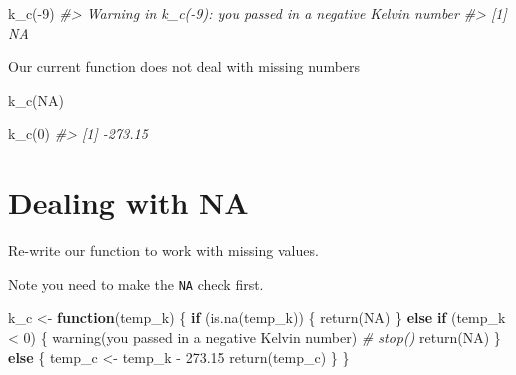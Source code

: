 \documentclass[
]{book}
\newenvironment{Shaded}{\begin{snugshade}}{\end{snugshade}}
\newcommand{\CommentTok}[1]{\textcolor[rgb]{0.56,0.35,0.01}{\textit{#1}}}
\newcommand{\ConstantTok}[1]{\textcolor[rgb]{0.00,0.00,0.00}{#1}}
\newcommand{\ControlFlowTok}[1]{\textcolor[rgb]{0.13,0.29,0.53}{\textbf{#1}}}
\newcommand{\DecValTok}[1]{\textcolor[rgb]{0.00,0.00,0.81}{#1}}
\newcommand{\FloatTok}[1]{\textcolor[rgb]{0.00,0.00,0.81}{#1}}
\newcommand{\FunctionTok}[1]{\textcolor[rgb]{0.00,0.00,0.00}{#1}}
\newcommand{\NormalTok}[1]{#1}
\newcommand{\OtherTok}[1]{\textcolor[rgb]{0.56,0.35,0.01}{#1}}
\newcommand{\SpecialCharTok}[1]{\textcolor[rgb]{0.00,0.00,0.00}{#1}}
\newcommand{\StringTok}[1]{\textcolor[rgb]{0.31,0.60,0.02}{#1}}
\begin{document}
\begin{Shaded}
\begin{Highlighting}[]
\FunctionTok{k\_c}\NormalTok{(}\SpecialCharTok{{-}}\DecValTok{9}\NormalTok{)}
\CommentTok{\#\textgreater{} Warning in k\_c({-}9): you passed in a negative Kelvin number}
\CommentTok{\#\textgreater{} [1] NA}
\end{Highlighting}
\end{Shaded}

Our current function does not deal with missing numbers

\begin{Shaded}
\begin{Highlighting}[]
\FunctionTok{k\_c}\NormalTok{(}\ConstantTok{NA}\NormalTok{)}
\end{Highlighting}
\end{Shaded}

\begin{Shaded}
\begin{Highlighting}[]
\FunctionTok{k\_c}\NormalTok{(}\DecValTok{0}\NormalTok{)}
\CommentTok{\#\textgreater{} [1] {-}273.15}
\end{Highlighting}
\end{Shaded}

\hypertarget{dealing-with-na}{%
\section{Dealing with NA}\label{dealing-with-na}}

Re-write our function to work with missing values.

Note you need to make the \texttt{NA} check first.

\begin{Shaded}
\begin{Highlighting}[]
\NormalTok{k\_c }\OtherTok{\textless{}{-}} \ControlFlowTok{function}\NormalTok{(temp\_k) \{}
    \ControlFlowTok{if}\NormalTok{ (}\FunctionTok{is.na}\NormalTok{(temp\_k)) \{}
        \FunctionTok{return}\NormalTok{(}\ConstantTok{NA}\NormalTok{)}
\NormalTok{    \} }\ControlFlowTok{else} \ControlFlowTok{if}\NormalTok{ (temp\_k }\SpecialCharTok{\textless{}} \DecValTok{0}\NormalTok{) \{}
        \FunctionTok{warning}\NormalTok{(}\StringTok{\textquotesingle{}you passed in a negative Kelvin number\textquotesingle{}}\NormalTok{)}
        \CommentTok{\# stop()}
        \FunctionTok{return}\NormalTok{(}\ConstantTok{NA}\NormalTok{)}
\NormalTok{    \} }\ControlFlowTok{else}\NormalTok{ \{}
\NormalTok{        temp\_c }\OtherTok{\textless{}{-}}\NormalTok{ temp\_k }\SpecialCharTok{{-}} \FloatTok{273.15}
        \FunctionTok{return}\NormalTok{(temp\_c)}
\NormalTok{    \}}
\NormalTok{\}}
\end{Highlighting}
\end{Shaded}
\end{document}
